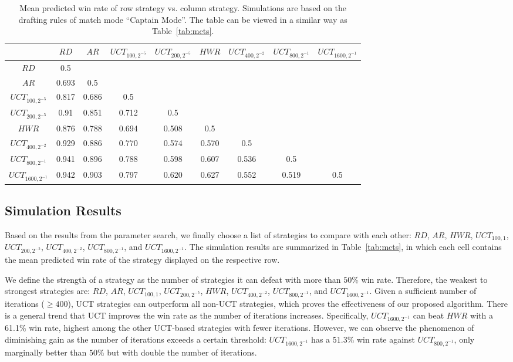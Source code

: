 \begin{table}
  \caption{Mean predicted win rate of row strategy  vs. column strategy. Simulations are based on the drafting rules of match mode ``Captain Mode''. The table can be viewed in a similar way as Table~\ref{tab:mcts}.}
  \label{tab:mcts_captain_mode}
  \centering
  \begin{tabular}{ccccccccc}
    \toprule
      & $RD$ & $AR$ & $UCT_{100, 2^{-5}}$ & $UCT_{200, 2^{-5}}$ & $HWR$  & $UCT_{400, 2^{-2}}$ & $UCT_{800, 2^{-1}}$ & $UCT_{1600, 2^{-1}}$ \\
    \midrule
    $RD$ & 0.5 &  &  &  &  &  &  &  \\
    $AR$ & 0.693 & 0.5 &  &  &  &  &  & \\
    $UCT_{100, 2^{-5}}$ & 0.817 & 0.686 & 0.5 & & &  &  \\
    $UCT_{200, 2^{-5}}$ & 0.91 & 0.851 & 0.712 & 0.5 & & & \\
    $HWR$ & 0.876 & 0.788 & 0.694  & 0.508 & 0.5 \\
    $UCT_{400, 2^{-2}}$ & 0.929 & 0.886 & 0.770 & 0.574 & 0.570 &  0.5  \\
    $UCT_{800, 2^{-1}}$ & 0.941 & 0.896 & 0.788 & 0.598 & 0.607 & 0.536 & 0.5 &  \\
$UCT_{1600, 2^{-1}}$ & 0.942 & 0.903 & 0.797 & 0.620 & 0.627 & 0.552 & 0.519 &  0.5 \\
  \bottomrule
\end{tabular}
\end{table}


\subsection{Simulation Results}
Based on the results from the parameter search, we finally choose a list of strategies to compare with each other: $RD$, $AR$, $HWR$, $UCT_{100, 1}$, $UCT_{200, 2^{-5}}$, $UCT_{400, 2^{-2}}$, $UCT_{800, 2^{-1}}$, and $UCT_{1600, 2^{-1}}$. The simulation results are summarized in Table~\ref{tab:mcts}, in which each cell contains the mean predicted win rate of the strategy displayed on the respective row. 

We define the strength of a strategy as the number of strategies it can defeat with more than $50\%$ win rate. Therefore, the weakest to strongest strategies are: $RD$, $AR$, $UCT_{100, 1}$, $UCT_{200, 2^{-5}}$, $HWR$, $UCT_{400, 2^{-2}}$, $UCT_{800, 2^{-1}}$, and $UCT_{1600, 2^{-1}}$. Given a sufficient number of iterations ($\geq400$), UCT strategies can outperform all non-UCT strategies, which proves the effectiveness of our proposed algorithm. There is a general trend that UCT improves the win rate as the number of iterations increases. Specifically, $UCT_{1600, 2^{-1}}$ can beat $HWR$ with a 61.1\% win rate, highest among the other UCT-based strategies with fewer iterations. However, we can observe the phenomenon of diminishing gain as the number of iterations exceeds a certain threshold: $UCT_{1600, 2^{-1}}$ has a $51.3\%$ win rate against $UCT_{800, 2^{-1}}$, only marginally better than $50\%$ but with double the number of iterations.

